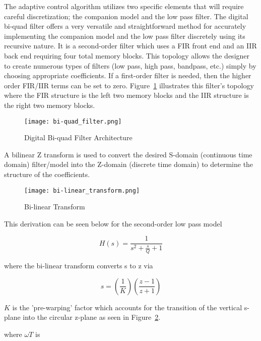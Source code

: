 The \Lone adaptive control algorithm utilizes two specific elements that will require careful discretization; the companion model and the low pass filter.  The digital bi-quad filter offers a very versatile and straightforward method for accurately implementing the companion model and the low pass filter discretely using its recursive nature.  It is a second-order filter which uses a \ac{FIR} front end and an \ac{IIR} back end requiring four total memory blocks.  This topology allows the designer to create numerous types of filters (low pass, high pass, bandpass, etc.) simply by choosing appropriate coefficients.  If a first-order filter is needed, then the higher order FIR/IIR terms can be set to zero.  Figure~\ref{fig:bi-quad} illustrates this filter's topology where the \ac{FIR} structure is the left two memory blocks and the \ac{IIR} structure is the right two memory blocks.

\begin{figure}[h!]
 \centering
  \texttt{[image: bi-quad\_filter.png]}
  \caption{Digital Bi-quad Filter Architecture }
  \label{fig:bi-quad}
\end{figure}

A bilinear Z transform is used to convert the desired S-domain (continuous time domain) filter/model into the Z-domain (discrete time domain) to determine the structure of the coefficients.

\begin{figure}[h!]
 \centering
  \texttt{[image: bi-linear\_transform.png]}
  \caption{Bi-linear Transform}
  \label{fig:bi-linear_transform}
\end{figure}

This derivation can be seen below for the second-order low pass model

\begin{equation}
 H(s) = \frac{1}{s^2+\frac{s}{Q}+1}
\end{equation}

where the bi-linear transform converts s to z via

\begin{equation}
 s = \left(\frac{1}{K}\right)\left(\frac{z-1}{z+1}\right)
\end{equation}

$K$ is the 'pre-warping' factor which accounts for the transition of the vertical s-plane into the circular z-plane as seen in Figure~\ref{fig:bi-linear_transform}.

where $\omega T$ is

